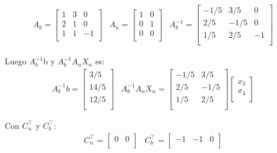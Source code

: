 \documentclass{article}
\begin{document}
\begin{flushleft}
		\begin{equation*}
			\begin{array}{ccc}
				A_b = \begin{bmatrix}
					1 & 3 & 0 \\
					2 & 1 & 0\\
					1 & 1 & -1 \\
				\end{bmatrix} &
				A_n = \begin{bmatrix}
					1 & 0 \\
					0 & 1 \\
					0 & 0 \\
				\end{bmatrix} &
				A_b^{-1} = \begin{bmatrix}
					-1/5 & 3/5 & 0\\
					2/5 & -1/5 & 0 \\
					1/5 & 2/5 & -1 \\
				\end{bmatrix}
			\end{array}
		\end{equation*}

		Luego $A_b^{-1}$b y $A_b^{-1}$$A_n$$X_n$ es:
		\begin{equation*}
			\begin{array}{cc}
				A_b^{-1}b = \begin{bmatrix}
					3/5\\
					14/5 \\
					12/5 \\
				\end{bmatrix} &
				A_b^{-1}A_nX_n = \begin{bmatrix}
					-1/5 & 3/5  \\
					2/5 & -1/5 \\
					1/5 & 2/5  \\
				\end{bmatrix}
				\begin{bmatrix}
					x_3 \\
					x_4 \\
				\end{bmatrix}
			\end{array}
		\end{equation*}

		Con $C_n^\intercal$ y $C_b^\intercal$:
		\begin{equation*}
			\begin{array}{cc}
				C_n^\intercal = \begin{bmatrix}
					0 & 0 \\
				\end{bmatrix} &
				C_b^\intercal = \begin{bmatrix}
					-1 & -1 & 0 \\
				\end{bmatrix}
			\end{array}
		\end{equation*}


\end{flushleft}
\end{document}
